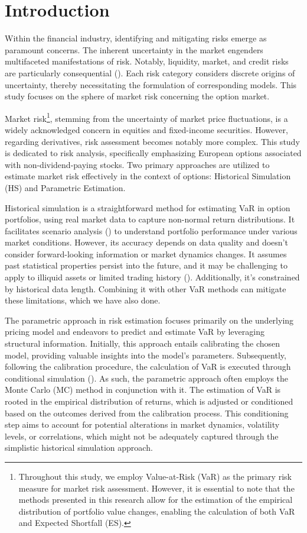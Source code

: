 \section{Introduction}\label{chap:intro}

Within the financial industry, identifying and mitigating risks emerge as paramount concerns. The inherent uncertainty in the market engenders multifaceted manifestations of risk. Notably, liquidity, market, and credit risks are particularly consequential (\cite{hull2012risk}). Each risk category considers discrete origins of uncertainty, thereby necessitating the formulation of corresponding models. This study focuses on the sphere of market risk concerning the option market.

Market risk\footnote{Throughout this study, we employ Value-at-Risk (VaR) as the primary risk measure for market risk assessment. However, it is essential to note that the methods presented in this research allow for the estimation of the empirical distribution of portfolio value changes, enabling the calculation of both VaR and Expected Shortfall (ES).}, stemming from the uncertainty of market price fluctuations, is a widely acknowledged concern in equities and fixed-income securities. However, regarding derivatives, risk assessment becomes notably more complex. This study is dedicated to risk analysis, specifically emphasizing European options associated with non-dividend-paying stocks. Two primary approaches are utilized to estimate market risk effectively in the context of options: Historical Simulation (HS) and Parametric Estimation.

Historical simulation is a straightforward method for estimating VaR in option portfolios, using real market data to capture non-normal return distributions. It facilitates scenario analysis (\cite{hull2012risk}) to understand portfolio performance under various market conditions. However, its accuracy depends on data quality and doesn't consider forward-looking information or market dynamics changes. It assumes past statistical properties persist into the future, and it may be challenging to apply to illiquid assets or limited trading history (\cite{pritsker2006hidden}). Additionally, it's constrained by historical data length. Combining it with other VaR methods can mitigate these limitations, which we have also done.

The parametric approach in risk estimation focuses primarily on the underlying pricing model and endeavors to predict and estimate VaR by leveraging structural information. Initially, this approach entails calibrating the chosen model, providing valuable insights into the model's parameters. Subsequently, following the calibration procedure, the calculation of VaR is executed through conditional simulation (\cite{glasserman2000efficient}). As such, the parametric approach often employs the Monte Carlo (MC) method in conjunction with it. The estimation of VaR is rooted in the empirical distribution of returns, which is adjusted or conditioned based on the outcomes derived from the calibration process. This conditioning step aims to account for potential alterations in market dynamics, volatility levels, or correlations, which might not be adequately captured through the simplistic historical simulation approach.

